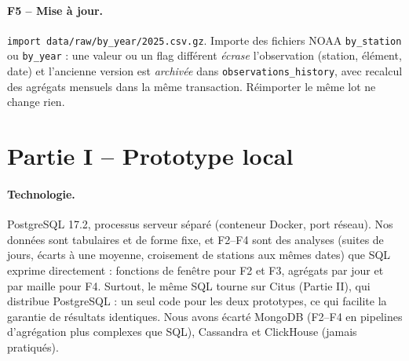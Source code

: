 \documentclass{rapportClass}
\newcommand{\cmd}[1]{\texttt{#1}}
\begin{document}
\paragraph{F5 -- Mise à jour.} \cmd{import data/raw/by\_year/2025.csv.gz}. Importe des fichiers NOAA
\cmd{by\_station} ou \cmd{by\_year} : une valeur ou un flag différent \emph{écrase} l'observation (station,
élément, date) et l'ancienne version est \emph{archivée} dans \cmd{observations\_history}, avec recalcul des
agrégats mensuels dans la même transaction. Réimporter le même lot ne change rien.

\section{Partie I -- Prototype local}


\paragraph{Technologie.} PostgreSQL 17.2, processus serveur séparé (conteneur Docker, port réseau).
Nos données sont tabulaires et de forme fixe, et F2--F4 sont des analyses (suites de jours, écarts à une moyenne,
croisement de stations aux mêmes dates) que SQL exprime directement : fonctions de fenêtre pour F2 et F3, agrégats
par jour et par maille pour F4. Surtout, le même SQL
tourne sur Citus (Partie II), qui distribue PostgreSQL : un seul code pour les deux prototypes, ce qui facilite la
garantie de résultats identiques. Nous avons écarté MongoDB (F2--F4 en pipelines d'agrégation plus complexes que SQL),
Cassandra et ClickHouse (jamais pratiqués).
\end{document}
